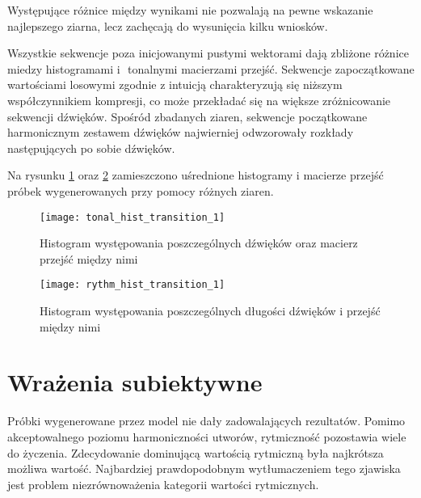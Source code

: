 {{        Występujące różnice między wynikami nie pozwalają na pewne wskazanie najlepszego ziarna, lecz 
        zachęcają do wysunięcia kilku wniosków.

        Wszystkie sekwencje poza inicjowanymi pustymi wektorami dają zbliżone różnice miedzy histogramami i\,\,
        tonalnymi macierzami przejść. 
        Sekwencje zapoczątkowane wartościami losowymi zgodnie z\,\,intuicją charakteryzują się niższym współczynnikiem
        kompresji, co może przekładać się na większe zróżnicowanie sekwencji dźwięków.
        Spośród zbadanych ziaren, sekwencje początkowane harmonicznym zestawem dźwięków najwierniej
        odwzorowały rozkłady następujących po sobie dźwięków.

        \bigskip
        
        Na rysunku \ref{tonal_hist_transition_1} oraz \ref{rythm_hist_transition_1} zamieszczono uśrednione 
        histogramy i\,\,macierze przejść próbek wygenerowanych przy pomocy różnych ziaren.

        \begin{figure}
            \centering
            \texttt{[image: tonal\_hist\_transition\_1]}
            \caption{Histogram występowania poszczególnych dźwięków oraz macierz przejść między nimi}
            \label{tonal_hist_transition_1}
        \end{figure}

        \begin{figure}
            \centering
            \texttt{[image: rythm\_hist\_transition\_1]}
            \caption{Histogram występowania poszczególnych długości dźwięków i\,\,przejść między nimi}
            \label{rythm_hist_transition_1}
        \end{figure}
    }

    \section{Wrażenia subiektywne}
    {
        Próbki wygenerowane przez model nie dały zadowalających rezultatów. Pomimo akceptowalnego poziomu 
        harmoniczności utworów, rytmiczność pozostawia wiele do życzenia. Zdecydowanie dominującą wartością 
        rytmiczną była najkrótsza możliwa wartość. Najbardziej prawdopodobnym wytłumaczeniem tego zjawiska jest 
        problem niezrównoważenia kategorii wartości rytmicznych. 

}}
